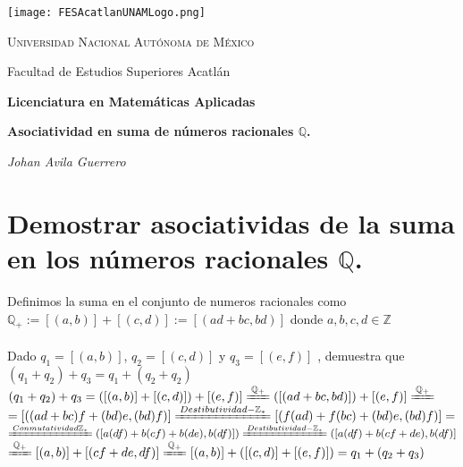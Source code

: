 \documentclass[a4paper,12pt]{article}
\begin{document}
\begin{titlepage}
    \centering
    \texttt{[image: FESAcatlanUNAMLogo.png]} %
    \vspace{1cm}
    
    {\scshape\large Universidad Nacional Autónoma de México \par}
    {\large Facultad de Estudios Superiores Acatlán \par}
    \vspace{1.5cm}
    
    {\Large\bfseries Licenciatura en Matemáticas Aplicadas \par}
    \vspace{2cm}
    
    {\Huge\bfseries  Asociatividad en suma de números racionales \(\mathbb{Q}\).

    \par}
    \vspace{2cm}
    
    {\Large\itshape Johan Avila Guerrero \par}
    \vfill
    
    
    \vfill
    
\end{titlepage}



\section*{Demostrar asociatividas de la  suma en los números racionales \(\mathbb{Q}\).}
\noindent  Definimos la suma en el conjunto de numeros racionales como \(\mathbb{Q}_{+} := [(a,b)] + [(c,d)] := [(ad + bc , bd)] \) donde \(a,b,c,d \in \mathbb{Z}\)  \\ \\


Dado \(q_{1} = [(a,b)]\),  \(q_{2} = [(c,d)]\) y \(q_{3} = [(e,f)]\) , demuestra que \((q_{1}  +  q_{2}) + q_{3} =  q_{1}  + (q_{2} + q_{2})   \) \\

 \((q_{1}  +  q_{2}) + q_{3} =  ([(a,b)] + [(c,d)] ) + [(e,f)]   \xlongequal[]{ \mathbb{Q}_{+}} ([(ad+bc,bd)] ) + [(e,f)]  \xlongequal[]{ \mathbb{Q}_{+}}  \)\\ 

 \( = [( (ad+bc) f + (bd) e , (bd)f  )]   \xlongequal[]{ Destibutividad- \mathbb{Z}_{*} }  [( f(ad)+ f(bc) + (bd) e , (bd)f  )] = \) \\


 \( \xlongequal[]{ Conmutatividad \mathbb{Z}_{*} } ([ a(df)+ b(cf)+b(de), b(df) ]) \xlongequal[]{  Destibutividad-\mathbb{Z}_{*} }  ([ a(df)+ b(cf+ 
 de), b(df)]  \) \\

\( \xlongequal[]{  \mathbb{Q}_{+}} [(a,b)] + [(cf+de, df)] \xlongequal[]{  \mathbb{Q}_{+}} [(a,b)] + ([(c,d)] +[(e,f)] ) = q_{1} + (q_{2} + q_{3})  \)
\end{document}
